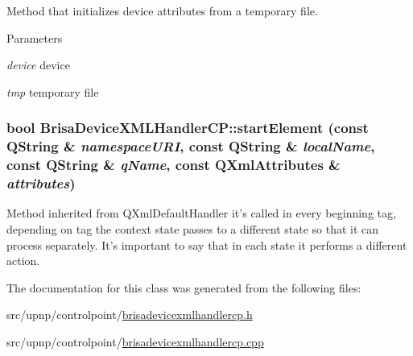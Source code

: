 Method that initializes device attributes from a temporary file. 
\begin{DoxyParams}{Parameters}
\item[{\em device}]device \item[{\em tmp}]temporary file \end{DoxyParams}
\hypertarget{classBrisaUpnp_1_1BrisaDeviceXMLHandlerCP_a5918cfec2377b9dbea98eeaaaeb0febd}{
\subsubsection[{startElement}]{\setlength{\rightskip}{0pt plus 5cm}bool BrisaDeviceXMLHandlerCP::startElement (const QString \& {\em namespaceURI}, \/  const QString \& {\em localName}, \/  const QString \& {\em qName}, \/  const QXmlAttributes \& {\em attributes})}}
\label{classBrisaUpnp_1_1BrisaDeviceXMLHandlerCP_a5918cfec2377b9dbea98eeaaaeb0febd}


Method inherited from QXmlDefaultHandler it's called in every beginning tag, depending on tag the context state passes to a different state so that it can process separately. It's important to say that in each state it performs a different action. 

The documentation for this class was generated from the following files:\begin{DoxyCompactItemize}
\item 
src/upnp/controlpoint/\hyperlink{brisadevicexmlhandlercp_8h}{brisadevicexmlhandlercp.h}\item 
src/upnp/controlpoint/\hyperlink{brisadevicexmlhandlercp_8cpp}{brisadevicexmlhandlercp.cpp}\end{DoxyCompactItemize}
